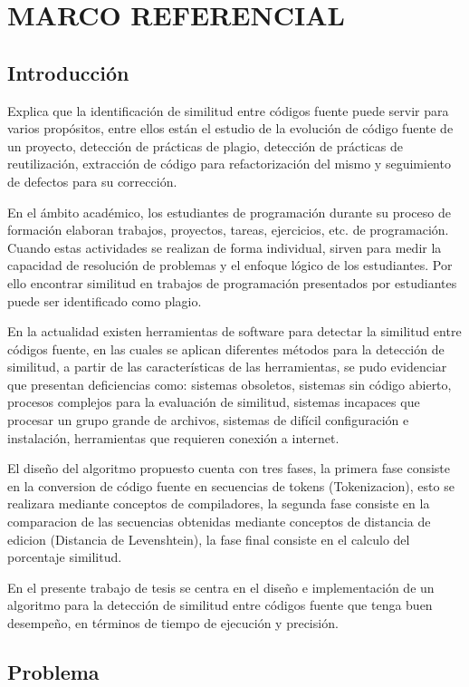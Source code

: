 \chapter{MARCO REFERENCIAL}
\section{Introducción}
\cite{Cheers2021} Explica que la identificación de similitud entre códigos fuente puede servir para varios propósitos, entre ellos están el estudio de la evolución de código fuente de un proyecto, detección de prácticas de plagio, detección de prácticas de reutilización, extracción de código para refactorización del mismo y seguimiento de defectos para su corrección.

En el ámbito académico, los estudiantes de programación durante su proceso de formación elaboran trabajos, proyectos, tareas, ejercicios, etc. de programación. Cuando estas actividades se realizan de forma individual, sirven para medir la capacidad de resolución de problemas y el enfoque lógico de los estudiantes. Por ello encontrar similitud en trabajos de programación presentados por estudiantes puede ser identificado como plagio.

En la actualidad existen herramientas de software para detectar la similitud entre códigos fuente, en las cuales se aplican diferentes métodos para la detección de similitud, a partir de las características de las herramientas, se pudo evidenciar que presentan deficiencias como: sistemas obsoletos, sistemas sin código abierto, procesos complejos para la evaluación de similitud, sistemas incapaces que procesar un grupo grande de archivos, sistemas de difícil configuración e instalación, herramientas que requieren conexión a internet.

El diseño del algoritmo propuesto cuenta con tres fases, la primera fase consiste en la conversion de código fuente en secuencias de tokens (Tokenizacion), esto se realizara mediante conceptos de compiladores, la segunda fase consiste en la comparacion de las secuencias obtenidas mediante conceptos de distancia de edicion (Distancia de Levenshtein), la fase final consiste en el calculo del porcentaje similitud.

En el presente trabajo de tesis se centra en el diseño e implementación de un algoritmo para la detección de similitud entre códigos fuente que tenga buen desempeño, en términos de tiempo de ejecución y precisión.

\section{Problema}
